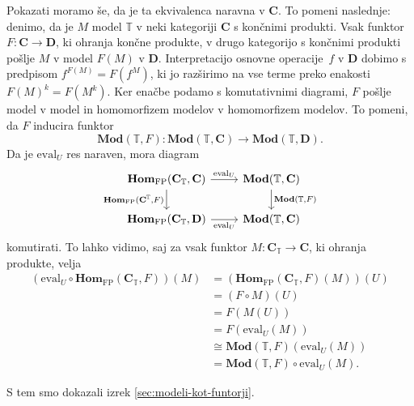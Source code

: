 \documentclass[../kategoricna_logika.tex]{subfiles}
\begin{document}
\begin{dokaz}
Pokazati moramo še, da je ta ekvivalenca naravna v $\mathbf{C}$.
To pomeni naslednje: denimo, da je $M$ model $\mathbb{T}$ v neki kategoriji
$\mathbf{C}$ s končnimi produkti. Vsak funktor $F : \mathbf{C} \to \mathbf{D}$,
ki ohranja končne produkte, v drugo kategorijo s končnimi produkti
pošlje $M$ v model $F(M)$ v $\mathbf{D}$. Interpretacijo osnovne operacije~$f$
v $\mathbf{D}$ dobimo s predpisom $f^{F(M)} = F(f^M)$, ki jo razširimo na
vse terme preko enakosti $F(M)^k = F(M^k)$.
Ker enačbe podamo s komutativnimi diagrami, $F$ pošlje model v model in
homomorfizem modelov v homomorfizem modelov. To pomeni, da $F$ inducira
funktor
\[ \mathbf{Mod}(\mathbb{T}, F) : \mathbf{Mod}(\mathbb{T}, \mathbf{C}) \to \mathbf{Mod}(\mathbb{T}, \mathbf{D}). \]
Da je $\mathrm{eval}_U$ res naraven, mora diagram
\begin{equation}
\begin{tikzcd}
  \mathbf{Hom}_{\mathrm{FP}}(\mathbf{C}_{\mathbb{T}}, \mathbf{C}) \ar[r, "{\mathrm{eval}_U}"]
  \ar[d, "{\mathbf{Hom}_{\mathrm{FP}}(\cat{C}^{\mathbb{T}}, F)}"']& \mathbf{Mod}(\mathbb{T}, \mathbf{C})
  \ar[d, "{\mathbf{Mod}(\mathbb{T}, F)}"] \\
  \mathbf{Hom}_{\mathrm{FP}}(\mathbf{C}_{\mathbb{T}}, \mathbf{D}) \ar[r, "{\mathrm{eval}_{U}}"']   & \mathbf{Mod}(\mathbb{T}, \mathbf{C})
\end{tikzcd}
\end{equation}
komutirati. To lahko vidimo, saj za vsak funktor $M : \mathbf{C}_{\mathbb{T}} \to \mathbf{C}$,
ki ohranja produkte, velja
\begin{align*}
  (\mathrm{eval}_U \circ \mathbf{Hom}_{\mathrm{FP}}(\mathbf{C}_{\mathbb{T}}, F))(M) &= (\mathbf{Hom}_{\mathrm{FP}}(\mathbf{C}_{\mathbb{T}}, F)(M))(U) \\
                                                                                  &= (F \circ M)(U) \\
                                                                                  &= F(M(U)) \\
                                                                                  &= F(\mathrm{eval}_U(M)) \\
                                                                                  &\cong \mathbf{Mod}(\mathbb{T}, F)(\mathrm{eval}_U(M)) \\
  &= \mathbf{Mod}(\mathbb{T}, F) \circ \mathrm{eval}_U(M).
\end{align*}
\end{dokaz}
S tem smo dokazali izrek \ref{sec:modeli-kot-funtorji}.
\end{document}
